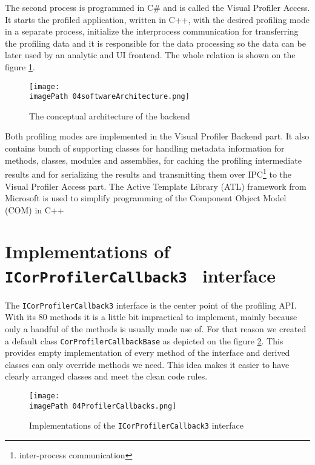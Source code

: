 The second process is programmed in C\# and is called the Visual Profiler Access. It starts the profiled application, written in C++, with the desired profiling mode in a separate process, initialize the interprocess communication for transferring the profiling data and it is responsible for the data processing so the data can be later used by an analytic and UI frontend. The whole relation is shown on the figure  \ref{fig:04softwareArchitecture}.

\begin{figure}
	\centering
		\texttt{[image: \\imagePath 04softwareArchitecture.png]}
		\caption{The conceptual architecture of the backend}
	\label{fig:04softwareArchitecture}
\end{figure}

Both profiling modes are implemented in the Visual Profiler Backend part. It also contains bunch of supporting classes for handling metadata information for methods, classes, modules and assemblies, for caching the profiling intermediate results and for serializing the results and transmitting them over IPC\footnote{inter-process communication} to the Visual Profiler Access part. The Active Template Library (ATL) framework from Microsoft is used to simplify programming of the Component Object Model (COM) in C++

\section{Implementations of \texttt{ICorProfilerCallback3 } interface}
The \texttt{ICorProfilerCallback3} interface is the center point of the profiling API. With its 80 methods it is a little bit impractical to implement, mainly because only a handful of the methods is usually made use of. For that reason we created a default class \texttt{CorProfilerCallbackBase} as depicted on the figure \ref{fig:04ProfilerCallbacks}. This provides empty implementation of every method of the interface and derived classes can only override methods we need. This idea makes it easier to have clearly arranged classes and meet the clean code rules.

\begin{figure}
	\centering
		\texttt{[image: \\imagePath 04ProfilerCallbacks.png]}
		\caption{Implementations of the \texttt{ICorProfilerCallback3} interface}
	\label{fig:04ProfilerCallbacks}
\end{figure}

